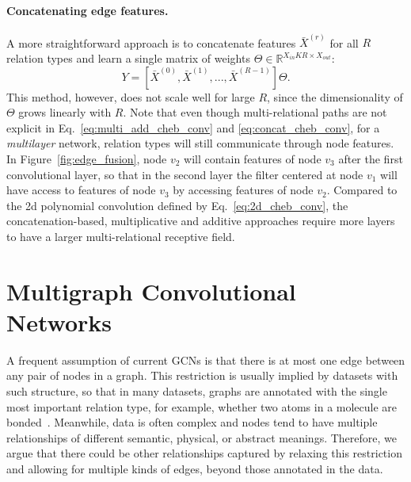 \documentclass[final,nonatbib]{article} \usepackage{nips_2018}
\begin{document}
	\paragraph{Concatenating edge features.} A more straightforward approach is to concatenate features $\bar{X}^{(r)}$ for all $R$ relation types and learn a single matrix of weights $\Theta \in \mathbb{R}^{X_{in}KR \times X_{out}}$:
\begin{equation}
	\label{eq:concat_cheb_conv}
	Y = [\bar{X}^{(0)}, \bar{X}^{(1)},...,\bar{X}^{(R-1)}] \Theta.
	\end{equation}
This method, however, does not scale well for large $R$, since the dimensionality of $\Theta$ grows linearly with $R$. Note that even though multi-relational paths are not explicit in Eq.~\ref{eq:multi_add_cheb_conv} and \ref{eq:concat_cheb_conv}, for a \textit{multilayer} network, relation types will still communicate through node features. In Figure~\ref{fig:edge_fusion}, node $v_2$ will contain features of node $v_3$ after the first convolutional layer, so that in the second layer the filter centered at node $v_1$ will have access to features of node $v_3$ by accessing features of node $v_2$. Compared to the 2d polynomial convolution defined by Eq.~\ref{eq:2d_cheb_conv}, the concatenation-based, multiplicative and additive approaches require more layers to have a larger multi-relational receptive field.


	\section{Multigraph Convolutional Networks}
	\label{sec:model}
	A frequent assumption of current GCNs is that there is at most one edge between any pair of nodes in a graph. This restriction is usually implied by datasets with such structure, so that in
	many datasets, graphs are annotated with the single most important relation type, for example, whether two atoms in a molecule are bonded~\cite{wale2008comparison, duvenaud2015convolutional}. Meanwhile, data is often complex and nodes tend to have multiple relationships of different semantic, physical, or abstract meanings. Therefore, we argue that there could be other relationships captured by relaxing this restriction and allowing for multiple kinds of edges, beyond those annotated in the data.
\end{document}
